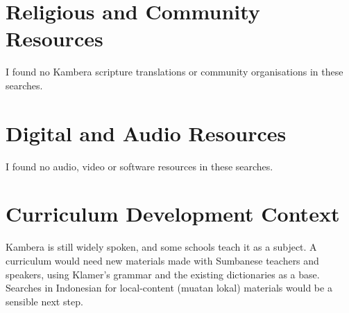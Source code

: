 \documentclass[12pt]{article}
\begin{document}
\section{Religious and Community Resources}
I found no Kambera scripture translations or community organisations in these searches.

\section{Digital and Audio Resources}
I found no audio, video or software resources in these searches.

\section{Curriculum Development Context}
Kambera is still widely spoken, and some schools teach it as a subject. A curriculum would need new materials made with Sumbanese teachers and speakers, using Klamer's grammar and the existing dictionaries as a base. Searches in Indonesian for local-content (muatan lokal) materials would be a sensible next step.
\end{document}

